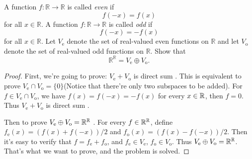 \documentclass{article}
\begin{document}
\begin{problem}[1C-24]
A function \( f : \mathbb{R} \to \mathbb{R} \) is called \emph{even} if
\[
f(-x) = f(x)
\]
for all \( x \in \mathbb{R} \). A function \( f : \mathbb{R} \to \mathbb{R} \) is called \emph{odd} if
\[
f(-x) = -f(x)
\]
for all \( x \in \mathbb{R} \). Let \( V_\mathrm{e} \) denote the set of real-valued even functions on \( \mathbb{R} \) and let \( V_\mathrm{o} \) denote the set of real-valued odd functions on \( \mathbb{R} \). Show that
\[
\mathbb{R}^{\mathbb{R}} = V_\mathrm{e} \oplus V_\mathrm{o}.
\]
\end{problem}

\begin{proof}
First, we're going to prove: $ V_\mathrm{e}+V_\mathrm{o} $ is direct sum . This is equivalent to prove  $ V_\mathrm{e}\cap V_\mathrm{o}=\{0\} $(Notice that there're only two subspaces to be added). For  $ f\in V_\mathrm{e}\cap V_\mathrm{o}$, we have  $ f(x)=f(-x)=-f(x) $ for every $ x\in\mathbb{R} $, then $ f=0 $. Thus $ V_\mathrm{e}+V_\mathrm{o} $ is direct sum .\par
Then to prove  $ V_\mathrm{e}\oplus V_\mathrm{o}=\mathbb{R}^{\mathbb{R}} $ . For every $ f\in\mathbb{R}^{\mathbb{R}} $, define $ f_\mathrm{e}(x)=(f(x)+f(-x))/2 $ and $ f_\mathrm{o}(x)=(f(x)-f(-x))/2 $. Then it's easy to verify that  $ f=f_\mathrm{e}+f_\mathrm{o} $, and  $ f_\mathrm{e}\in V_\mathrm{e} $,  $ f_\mathrm{o}\in V_\mathrm{o} $. Thus  $ V_\mathrm{e}\oplus V_\mathrm{o}=\mathbb{R}^{\mathbb{R}} $. That's what we want to prove, and the problem is solved.   
\end{proof}
\end{document}
